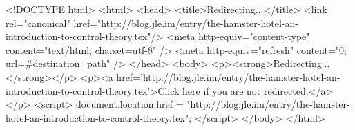 <!DOCTYPE html>
<html>
<head>
<title>Redirecting...</title>
<link rel="canonical" href="http://blog.jle.im/entry/the-hamster-hotel-an-introduction-to-control-theory.tex"/>
<meta http-equiv="content-type" content="text/html; charset=utf-8" />
<meta http-equiv="refresh" content="0; url=#{destination_path}" />
</head>
<body>
  <p><strong>Redirecting...</strong></p>
  <p><a href='http://blog.jle.im/entry/the-hamster-hotel-an-introduction-to-control-theory.tex'>Click here if you are not redirected.</a></p>
  <script>
    document.location.href = "http://blog.jle.im/entry/the-hamster-hotel-an-introduction-to-control-theory.tex";
  </script>
</body>
</html>
